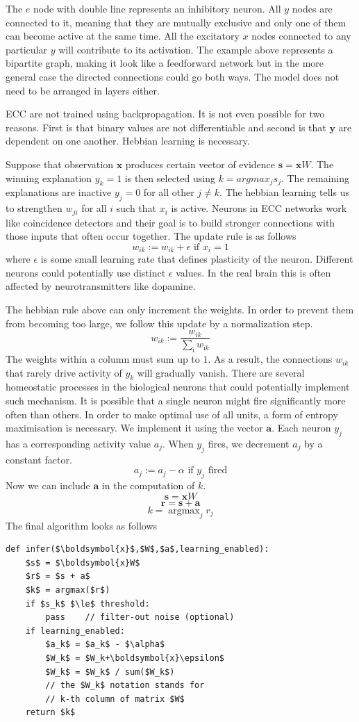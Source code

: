 \documentclass[12pt]{article}
\DeclareMathOperator*{\argmax}{argmax}
\begin{document}
The  $e$ node with double line represents an inhibitory neuron. All $y$ nodes are connected to it, meaning that they are mutually exclusive and only one of them can become active at the same time. All the excitatory $x$ nodes connected to any particular $y$ will contribute to its activation. The example above represents a bipartite graph, making it look like a feedforward network but in the more general case the directed connections could go both ways. The model does not need to be arranged in layers either.  

ECC are not trained using backpropagation. It is not even possible for two reasons. First is that binary values are not differentiable and second is that $\boldsymbol{y}$ are dependent on one another. Hebbian learning is necessary. 

Suppose that observation $\boldsymbol{x}$ produces certain vector of evidence $\boldsymbol{s}=\boldsymbol{x}W$. The winning explanation $y_k=1$ is then selected using $k=argmax_j s_j$. The remaining explanations are inactive $y_j=0$ for all other $j\ne k$.
The hebbian learning tells us to strengthen $w_{ji}$ for all $i$ such that $x_i$ is active. Neurons in ECC networks work like coincidence detectors and their goal is to build stronger connections with those inputs that often occur together. The update rule is as follows
\[
w_{ik} := w_{ik} + \epsilon \text{ if } x_i=1
\]
where $\epsilon$ is some small learning rate that defines plasticity of the neuron. Different neurons could potentially use distinct $\epsilon$ values. In the real brain this is often affected by neurotransmitters like dopamine. 

The hebbian rule above can only increment the weights. In order to prevent them from becoming too large, we follow this update by a normalization step.
\[
w_{ik} := \frac{w_{ik}}{ \sum_{ï} w_{ïk}} 
\]
The weights within a column must sum up to $1$. As a result, the connections $w_{ik}$ that rarely drive activity of $y_k$ will gradually vanish. There are several homeostatic processes in the biological neurons that could potentially implement such mechanism.  
It is possible that a single neuron might fire significantly more often than others. In order to make optimal use of all units, a form of entropy maximisation is necessary. We implement it using the vector $\boldsymbol{a}$. Each neuron $y_j$ has a corresponding activity value $a_j$.
When $y_j$ fires, we decrement $a_j$ by a constant factor.
\[
a_j := a_j - \alpha \text{ if } y_j \text{ fired}
\]
Now we can include $\boldsymbol{a}$ in the computation of $k$.
\[\boldsymbol{s} = \boldsymbol{x}W \]
\[\boldsymbol{r} = \boldsymbol{s} + \boldsymbol{a} \]
\[k = \argmax_j r_j \]
The final algorithm looks as follows
\begin{lstlisting}
def infer($\boldsymbol{x}$,$W$,$a$,learning_enabled):
    $s$ = $\boldsymbol{x}W$
    $r$ = $s + a$
    $k$ = argmax($r$)
    if $s_k$ $\le$ threshold:
        pass    // filter-out noise (optional)
    if learning_enabled:
        $a_k$ = $a_k$ - $\alpha$
        $W_k$ = $W_k+\boldsymbol{x}\epsilon$
        $W_k$ = $W_k$ / sum($W_k$)
        // the $W_k$ notation stands for 
        // k-th column of matrix $W$
    return $k$
\end{lstlisting}
\end{document}
